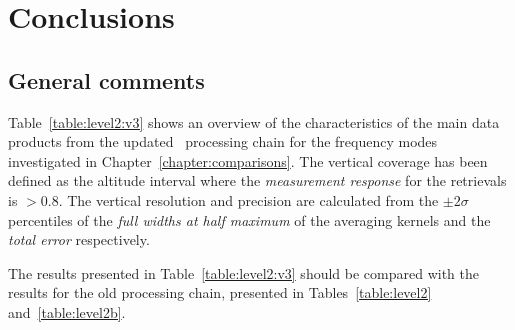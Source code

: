 \chapter{Conclusions}
\label{chapter:conclusions}
\section{General comments}


Table~\ref{table:level2:v3} shows an overview of the characteristics of the
main data products from the updated \smr\ processing chain for the frequency
modes investigated in Chapter~\ref{chapter:comparisons}. The vertical coverage
has been defined as the altitude interval where the \emph{measurement response}
for the retrievals is $>0.8$. The vertical resolution and precision are
calculated from the $\pm 2\sigma$ percentiles of the \emph{full widths at half
maximum} of the averaging kernels and the \emph{total error} respectively.

The results presented in Table~\ref{table:level2:v3} should be compared with
the results for the old processing chain, presented in
Tables~\ref{table:level2} and~\ref{table:level2b}.

